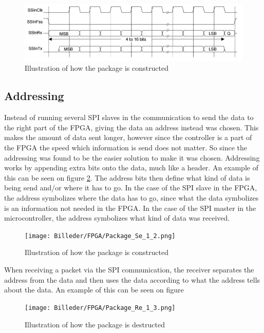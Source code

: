 \begin{figure}[h!]
\centering
\includegraphics[scale=0.5]{Billeder/FPGA/SPI_data_transfer.png}
\caption{ Illustration of how the package is constructed }
\label{fig:SPI_data_transfer}
\end{figure}

\subsection{Addressing}

Instead of running several SPI slaves in the communication to send the data to the right part of the FPGA, giving the data an address instead was chosen. This makes the amount of data sent longer, however since the controller is a part of the FPGA the speed which information is send does not matter. So since the addressing was found to be the easier solution to make it was chosen.
Addressing works by appending extra bits onto the data, much like a header. An example of this can be seen on figure \ref{fig:Package_Se_1_2}. The address bits then define what kind of data is being send and/or where it has to go. In the case of the SPI slave in the FPGA, the address symbolizes where the data has to go, since what the data symbolizes is an information not needed in the FPGA. In the case of the SPI master in the microcontroller, the address symbolizes what kind of data was received.

\begin{figure}[h!]
\centering
\texttt{[image: Billeder/FPGA/Package\_Se\_1\_2.png]}
\caption{ Illustration of how the package is constructed }
\label{fig:Package_Se_1_2}
\end{figure}

When receiving a packet via the SPI communication, the receiver separates the address from the data and then uses the data according to what the address tells about the data. An example of this can be seen on figure %

\begin{figure}[h!]
\centering
\texttt{[image: Billeder/FPGA/Package\_Re\_1\_3.png]}
\caption{ Illustration of how the package is destructed }
\label{fig:Package_Re_1_3}
\end{figure}

\newpage











